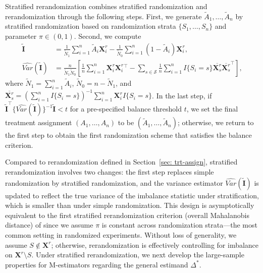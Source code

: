 \documentclass[12pt]{article}
\newcommand{\bX}{\boldsymbol{X}}\newcommand{\bO}{\boldsymbol{O}}
\newcommand{\bI}{\boldsymbol{I}}
\begin{document}
{Stratified rerandomization combines stratified randomization and rerandomization through the following steps. First, we generate $\widetilde{A}_1,\dots, \widetilde{A}_n$ by stratified randomization based on randomization strata $\{S_1,\dots, S_n\}$ and parameter $\pi \in (0,1)$. Second, we compute
    \begin{align*}
        \widetilde{\bI} &= \frac{1}{\widetilde{N}_1}\sum_{i=1}^n \widetilde{A}_i \bX_i^r - \frac{1}{\widetilde{N}_0} \sum_{i=1}^n (1-\widetilde{A}_i) \bX_i^r, \\
        \widehat{Var}(\widetilde{\bI}) &=  \frac{n}{\widetilde{N}_1\widetilde{N}_0} \left[\frac{1}{n}\sum_{i=1}^n \bX^r_i\bX^r_i{}^\top - \sum_{s \in \mathcal{S}} \frac{1}{n}\sum_{i=1}^n I\{S_i=s\}\overline{\bX_s^r}\overline{\bX_s^r}^\top\right],
    \end{align*}
where $\widetilde{N}_1 = \sum_{i=1}^n \widetilde{A}_i$, $\widetilde{N}_0 = n - \widetilde{N}_1$, and $\overline{\bX_s^r} = (\sum_{i=1}^n I\{S_i=s\})^{-1}\sum_{i=1}^n \bX_i^r I\{S_i=s\}$. In the last step, if $\widetilde{\bI}^\top \{\widehat{Var}(\widetilde{\bI})\}^{-1} \widetilde{\bI} < t$ for a pre-specified balance threshold $t$, we set the final treatment assignment $(A_1,\dots, A_n)$ to be $(\widetilde{A}_1,\dots, \widetilde{A}_n)$; otherwise, we return to the first step to obtain the first randomization scheme that satisfies the balance criterion.

Compared to rerandomization defined in Section~\ref{sec: trt-assign}, stratified rerandomization involves two changes: the first step replaces simple randomization by stratified randomization, and the variance estimator $\widehat{Var}(\widetilde{\bI})$ is updated to reflect the true variance of the imbalance statistic under stratification, which is smaller than under simple randomization. 
{This design is asymptotically equivalent to the first stratified rerandomization criterion (overall Mahalanobis distance) of \cite{wang2023rerandomization} since we assume $\pi$ is constant across randomization strata---the most common setting in randomized experiments.} 
Without loss of generality, we assume $S \notin \bX^r$; otherwise, rerandomization is effectively controlling for imbalance on $\bX^r\setminus S$.
Under stratified rerandomization, we next develop the large-sample properties for M-estimators regarding the general estimand $\Delta^*$.

}
\end{document}
